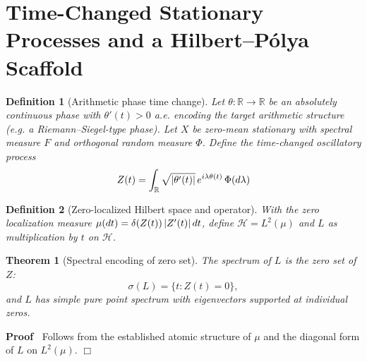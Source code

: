 \documentclass{article}
\newenvironment{proof}{\noindent\textbf{Proof\ }}{\hspace*{\fill}$\Box$\medskip}
\newtheorem{definition}{Definition}
\newtheorem{theorem}{Theorem}
\begin{document}
\section{Time-Changed Stationary Processes and a Hilbert--P{\'o}lya Scaffold}

\begin{definition}
  [Arithmetic phase time change] Let $\theta : \mathbb{R} \to \mathbb{R}$ be
  an absolutely continuous phase with $\theta' (t) > 0$ a.e. encoding the
  target arithmetic structure (e.g. a Riemann--Siegel-type phase). Let $X$ be
  zero-mean stationary with spectral measure $F$ and orthogonal random measure
  $\Phi$. Define the time-changed oscillatory process
  \begin{equation}
    Z (t) = \int_{\mathbb{R}} \sqrt{| \theta' (t) |}  \hspace{0.17em} e^{i
    \lambda \theta (t)}  \hspace{0.17em} \Phi (d \lambda)
  \end{equation}
\end{definition}

\begin{definition}
  [Zero-localized Hilbert space and operator] With the zero localization
  measure $\mu (dt) = \delta (Z (t)) \hspace{0.17em} |Z' (t) | 
  \hspace{0.17em} dt$, define $\mathcal{H}= L^2 (\mu)$ and $L$ as
  multiplication by $t$ on $\mathcal{H}$.
\end{definition}

\begin{theorem}
  [Spectral encoding of zero set] The spectrum of $L$ is the zero set of $Z$:
  \[ \sigma (L) = \{t : Z (t) = 0\}, \]
  and $L$ has simple pure point spectrum with eigenvectors supported at
  individual zeros.
\end{theorem}

\begin{proof}
  Follows from the established atomic structure of $\mu$ and the diagonal form
  of $L$ on $L^2 (\mu)$.
\end{proof}
\end{document}

